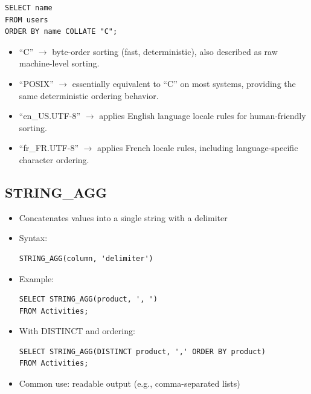 \documentclass[10pt]{article}
\begin{document}
\begin{verbatim}
SELECT name
FROM users
ORDER BY name COLLATE "C";
\end{verbatim}

\begin{itemize}
    \item ``C'' $\rightarrow$ byte-order sorting (fast, deterministic), also described as raw machine-level sorting.
    \item ``POSIX'' $\rightarrow$ essentially equivalent to ``C'' on most systems, providing the same deterministic ordering behavior.
    \item ``en\_US.UTF-8'' $\rightarrow$ applies English language locale rules for human-friendly sorting.
    \item ``fr\_FR.UTF-8'' $\rightarrow$ applies French locale rules, including language-specific character ordering.
\end{itemize}

\subsection{STRING\_AGG}
\begin{itemize}
    \item Concatenates values into a single string with a delimiter
    \item Syntax:
\begin{verbatim}
STRING_AGG(column, 'delimiter')
\end{verbatim}
    \item Example:
\begin{verbatim}
SELECT STRING_AGG(product, ', ')
FROM Activities;
\end{verbatim}
    \item With DISTINCT and ordering:
\begin{verbatim}
SELECT STRING_AGG(DISTINCT product, ',' ORDER BY product)
FROM Activities;
\end{verbatim}
    \item Common use: readable output (e.g., comma-separated lists)
\end{itemize}

\end{document}
